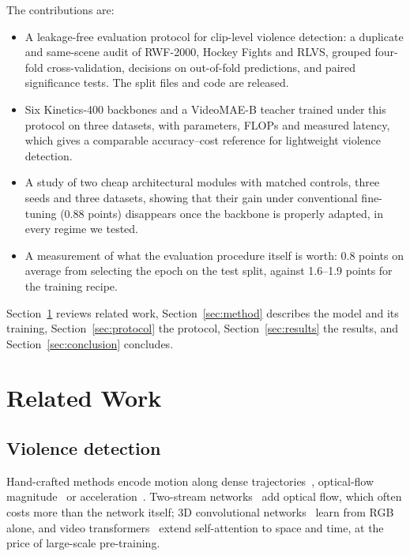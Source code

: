 \documentclass[conference]{IEEEtran}
\begin{document}
The contributions are:
\begin{itemize}
  \item A leakage-free evaluation protocol for clip-level violence
        detection: a duplicate and same-scene audit of RWF-2000, Hockey
        Fights and RLVS, grouped four-fold cross-validation, decisions on
        out-of-fold predictions, and paired significance tests. The split
        files and code are released.
  \item Six Kinetics-400 backbones and a VideoMAE-B teacher trained under
        this protocol on three datasets, with parameters, FLOPs and
        measured latency, which gives a comparable accuracy--cost
        reference for lightweight violence detection.
  \item A study of two cheap architectural modules with matched controls,
        three seeds and three datasets, showing that their gain under
        conventional fine-tuning (0.88 points) disappears once the
        backbone is properly adapted, in every regime we tested.
  \item A measurement of what the evaluation procedure itself is worth:
        0.8 points on average from selecting the epoch on the test split,
        against 1.6--1.9 points for the training recipe.
\end{itemize}

Section~\ref{sec:related} reviews related work, Section~\ref{sec:method}
describes the model and its training, Section~\ref{sec:protocol} the
protocol, Section~\ref{sec:results} the results, and
Section~\ref{sec:conclusion} concludes.

\section{Related Work}
\label{sec:related}

\subsection{Violence detection}

Hand-crafted methods encode motion along dense trajectories~\cite{idt},
optical-flow magnitude~\cite{vif} or acceleration~\cite{hockey}. Two-stream
networks~\cite{twostream} add optical flow, which often costs more than the
network itself; 3D convolutional networks~\cite{c3d,i3d,slowfast,x3d} learn
from RGB alone, and video transformers~\cite{timesformer,videoswin} extend
self-attention to space and time, at the price of large-scale
pre-training.
\end{document}
